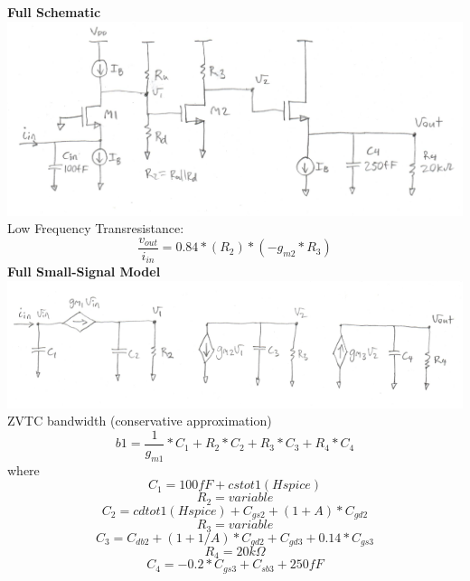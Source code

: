 \documentclass[fleqn]{article}
\begin{document}
\begin{flushleft}
\newpage
\textbf{Full Schematic}
\includegraphics[scale=1]{full_schematic}\\
Low Frequency Transresistance:
\begin{equation}
\frac{v_{out}}{i_{in}} = 0.84*(R_2)*(-g_{m2}*R_3)
\end{equation}
\vspace{5mm}
\textbf{Full Small-Signal Model}
\includegraphics[scale=1]{full_small_signal}
ZVTC bandwidth (conservative approximation)
\begin{equation}
b1 = \frac{1}{g_{m1}}*C_1 + R_2*C_2 + R_3*C_3 + R_4*C_4
\end{equation}
where
\begin{equation}
C_1 = 100fF + cstot1 (Hspice)
\end{equation}
\begin{equation}
R_2 = variable
\end{equation}
\begin{equation}
C_2 = cdtot1 (Hspice) + C_{gs2} + (1 + A)*C_{gd2}
\end{equation}
\begin{equation}
R_3 = variable
\end{equation}
\begin{equation}
C_3 = C_{db2} + (1 + 1/A)*C_{gd2} + C_{gd3} + 0.14*C_{gs3}
\end{equation}
\begin{equation}
R_4 = 20k\Omega
\end{equation}
\begin{equation}
C_4 = -0.2*C_{gs3} + C_{sb3} + 250fF
\end{equation}


\end{flushleft}
\end{document}
